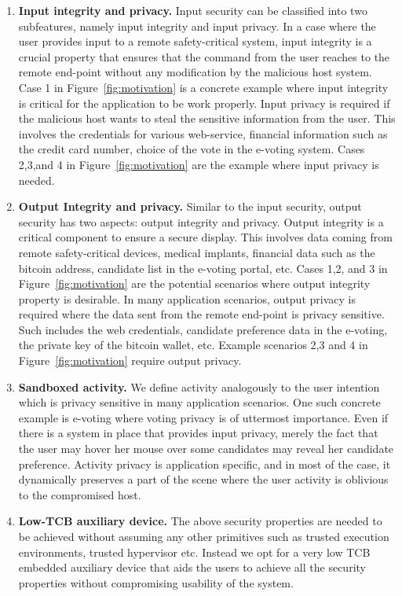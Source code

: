 \begin{enumerate}
  \item \textbf{Input integrity and privacy.} Input security can be classified into two subfeatures, namely input integrity and input privacy. In a case where the user provides input to a remote safety-critical system, input integrity is a crucial property that ensures that the command from the user reaches to the remote end-point without any modification by the malicious host system. Case 1 in Figure~\ref{fig:motivation} is a concrete example where input integrity is critical for the application to be work properly. Input privacy is required if the malicious host wants to steal the sensitive information from the user. This involves the credentials for various web-service, financial information such as the credit card number, choice of the vote in the e-voting system. Cases 2,3,and 4 in Figure~\ref{fig:motivation} are the example where input privacy is needed.
  \item \textbf{Output Integrity and privacy.} Similar to the input security, output security has two aspects: output integrity and privacy. Output integrity is a critical component to ensure a secure display. This involves data coming from remote safety-critical devices, medical implants, financial data such as the bitcoin address, candidate list in the e-voting portal, etc. Cases 1,2, and 3 in Figure~\ref{fig:motivation} are the potential scenarios where output integrity property is desirable. In many application scenarios, output privacy is required where the data sent from the remote end-point is privacy sensitive. Such includes the web credentials, candidate preference data in the e-voting, the private key of the bitcoin wallet, etc. Example scenarios 2,3 and 4 in Figure~\ref{fig:motivation} require output privacy.
  
  \item \textbf{Sandboxed activity.} We define activity analogously to the user intention which is privacy sensitive in many application scenarios. One such concrete example is e-voting where voting privacy is of uttermost importance. Even if there is a system in place that provides input privacy, merely the fact that the user may hover her mouse over some candidates may reveal her candidate preference. Activity privacy is application specific, and in most of the case, it dynamically preserves a part of the scene where the user activity is oblivious to the compromised host. 
  \item\textbf{Low-TCB auxiliary device.} The above security properties are needed to be achieved without assuming any other primitives such as trusted execution environments, trusted hypervisor etc. Instead we opt for a very low TCB embedded auxiliary device that aids the users to achieve all the security properties without compromising usability of the system. 
\end{enumerate}

